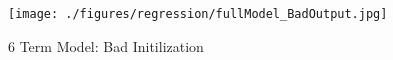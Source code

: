 \begin{figure}[ht!]
\texttt{[image: ./figures/regression/fullModel\_BadOutput.jpg]}
\centering
\caption{6 Term Model: Bad Initilization}
\label{fig:fullModel_BadOutput}
\end{figure}
